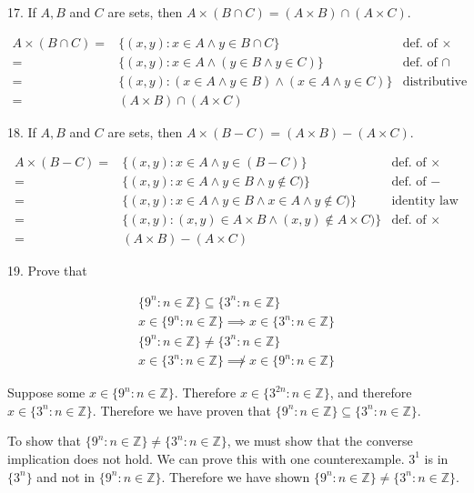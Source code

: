 \documentclass{idrisMemo}
\newcommand{\set}[1]{\{#1\}}
\begin{document}
\begin{prooflist}{17. If $A, B$ and $C$ are sets, then $A \times(B \cap C)=(A \times B) \cap(A \times C)$.}
\item
\begin{align*}
    A\times (B\cap C) =& \set{(x, y): x\in A \land y\in B\cap C} & \text{def. of }\times\\
    =& \set{(x,y): x\in A \land (y \in B \land y\in C)} & \text{def. of $\cap$}\\
    =& \set{(x,y): (x\in A \land y \in B) \land (x\in A \land y\in C)} &
    \text{distributive law}\\
    =& (A\times B) \cap (A\times C)
\end{align*}
\end{prooflist}

\begin{prooflist}{18. If $A, B$ and $C$ are sets, then $A \times(B-C)=(A \times B)-(A \times C)$.}
\item
\begin{align*}
    A\times (B-C) =& \set{(x, y): x\in A \land y\in (B-C)} & \text{def. of }\times\\
    =& \set{(x,y): x\in A \land y \in B \land y\notin C)} & \text{def. of }-\\
    =& \set{(x,y): x\in A \land y \in B \land x\in A \land y\notin C)} & \text{identity law}\\
    =& \set{(x,y): (x, y) \in A\times B \land (x, y) \notin A \times C)} &
    \text{def. of }\times\\
    =& (A\times B) - (A\times C)
\end{align*}
\end{prooflist}

\begin{prooflist}{19. Prove that}
\item
\begin{align*}
\set{9^n: n \in \mathbb{Z}} \subseteq\set{3^n: n \in \mathbb{Z}}\\
x\in \set{9^n: n \in \mathbb{Z}} \implies x\in\set{3^n: n \in \mathbb{Z}}\\
\set{9^n: n \in \mathbb{Z}} \neq\set{3^n: n \in \mathbb{Z}}\\
x\in\set{3^n: n \in \mathbb{Z}}
\not\implies
x\in \set{9^n: n \in \mathbb{Z}}
\end{align*}
\item Suppose some $x\in \set{9^n: n\in\mathbb{Z}}$. Therefore $x\in\set{3^{2n}:
    n\in\mathbb{Z}}$, and therefore $x\in\set{3^n: n\in\mathbb{Z}}$. Therefore
    we have proven that $\set{9^n: n \in \mathbb{Z}} \subseteq\set{3^n: n \in \mathbb{Z}}$.
\item To show that $\set{9^n: n \in \mathbb{Z}} \neq\set{3^n: n \in
    \mathbb{Z}}$, we must show that the converse implication does not hold. We
    can prove this with one counterexample. $3^1$ is in $\set{3^n}$ and not in
    $\set{9^n:n\in\mathbb{Z}}$. Therefore we have shown
$\set{9^n: n \in \mathbb{Z}} \neq\set{3^n: n \in \mathbb{Z}}$.
\end{prooflist}
\end{document}
